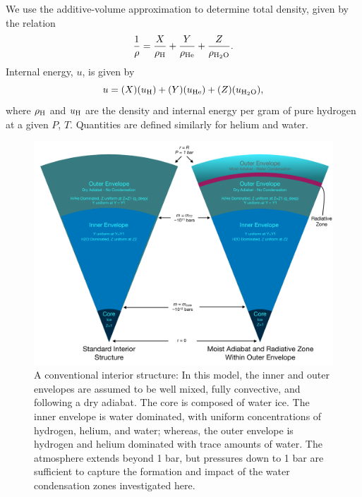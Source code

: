 \documentclass[11pt]{ucscthesisbs}
\begin{document}
We use the additive-volume approximation to determine total density, given by the relation
\begin{equation}
  \frac{1}{\rho} = \frac{X}{\rho_{\rm H}} + \frac{Y}{\rho_{\rm He}} + \frac{Z}{\rho_{\rm H_{2}O }}.
\end{equation}
Internal energy, $u$, is given by
\begin{equation}
 u = (X)(u_{\rm H}) + (Y)(u_{\rm He}) + (Z)(u_{\rm H_{2}O}),
\end{equation}
where $\rho_{\rm H}$ and $u_{\rm H}$ are the density and internal energy per gram of pure hydrogen at a given $P$, $T$. Quantities are defined similarly for helium and water.
\begin{figure}[ht!]
 \centerline{
  \includegraphics[width=\columnwidth]{figures/onion.pdf}
 }
\caption[A Standard Interior Structure Model]
{A conventional interior structure: In this model, the inner and outer envelopes are assumed to be well mixed, fully convective, and following a dry adiabat. The core is composed of water ice. The inner envelope is water dominated, with uniform concentrations of hydrogen, helium, and water; whereas, the outer envelope is hydrogen and helium dominated with trace amounts of water. The atmosphere extends beyond 1 bar, but pressures down to 1 bar are sufficient to capture the formation and impact of the water condensation zones investigated here.}
\label{fig:standard_dry_interior}
\end{figure}
\end{document}
